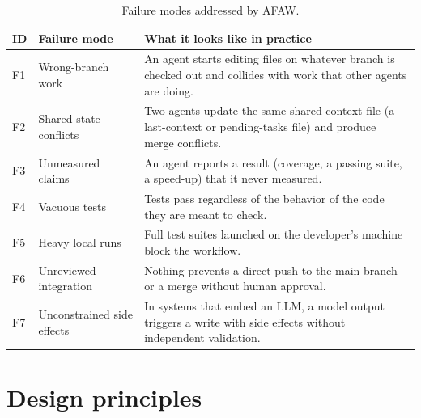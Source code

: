 \documentclass[11pt,a4paper]{article}
\begin{document}
\begin{table}[h]
\centering
\small
\begin{tabularx}{\textwidth}{@{}l>{\raggedright\arraybackslash}p{3.6cm}>{\raggedright\arraybackslash}X@{}}
\toprule
\textbf{ID} & \textbf{Failure mode} & \textbf{What it looks like in practice}\\
\midrule
F1 & Wrong-branch work & An agent starts editing files on whatever branch is checked out and collides with work that other agents are doing.\\
F2 & Shared-state conflicts & Two agents update the same shared context file (a last-context or pending-tasks file) and produce merge conflicts.\\
F3 & Unmeasured claims & An agent reports a result (coverage, a passing suite, a speed-up) that it never measured.\\
F4 & Vacuous tests & Tests pass regardless of the behavior of the code they are meant to check.\\
F5 & Heavy local runs & Full test suites launched on the developer's machine block the workflow.\\
F6 & Unreviewed integration & Nothing prevents a direct push to the main branch or a merge without human approval.\\
F7 & Unconstrained side effects & In systems that embed an LLM, a model output triggers a write with side effects without independent validation.\\
\bottomrule
\end{tabularx}
\caption{Failure modes addressed by AFAW.}
\label{tab:failures}
\end{table}

\section{Design principles}
\label{sec:principles}
\end{document}
